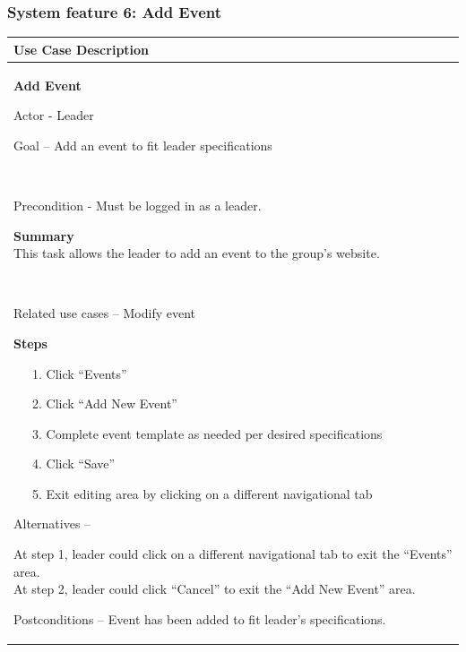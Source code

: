 \documentclass[letterpaper]{article}
\newcommand\textstyleDefaultParagraphFont[1]{#1}
\begin{document}
\subsubsection[System feature 6: Add Event]{\rmfamily System feature 6:
Add Event}
\begin{flushleft}
\tablehead{}
\begin{supertabular}{|m{6.42126in}|}
\hline
\bfseries\color{black} Use Case Description\\\hline
{\bfseries\color{black} Add Event}

{\color{black} Actor - Leader}

{\color{black} Goal -- Add an event to fit leader specifications}

~

{\color{black} Precondition - Must be logged in as a leader.}

{\color{black} \textstyleDefaultParagraphFont{\textbf{Summary}}\newline
\textstyleDefaultParagraphFont{This task allows the leader to
}\textstyleDefaultParagraphFont{add}\textstyleDefaultParagraphFont{
}\textstyleDefaultParagraphFont{an event to the
group}\textstyleDefaultParagraphFont{{\textquoteright}}\textstyleDefaultParagraphFont{s
website.}}

~

{\color{black} Related use cases -- Modify event}

{\bfseries\color{black} Steps}

{\color{black} \ \ \ 1. Click
{\textquotedblleft}Events{\textquotedblright}}

{\color{black} \ \ \ 2. Click {\textquotedblleft}Add New
Event{\textquotedblright}}

{\color{black} \ \ \ 3. Complete event template as needed per desired
specifications}

{\color{black} \ \ \ 4. Click
{\textquotedblleft}Save{\textquotedblright}}

{\color{black} \ \ \ 5. Exit editing area by clicking on a different
navigational tab}

{\color{black} Alternatives -- }

{\color{black} At step 1, leader could click on a different navigational
tab to exit the {\textquotedblleft}Events{\textquotedblright}
area.\newline
At step 2, leader could click
{\textquotedblleft}Cancel{\textquotedblright} to exit the
{\textquotedblleft}Add New Event{\textquotedblright} area.}

\color{black} Postconditions -- Event has been added to fit
leader{\textquoteright}s specifications.\\\hline
\end{supertabular}
\end{flushleft}
\end{document}
